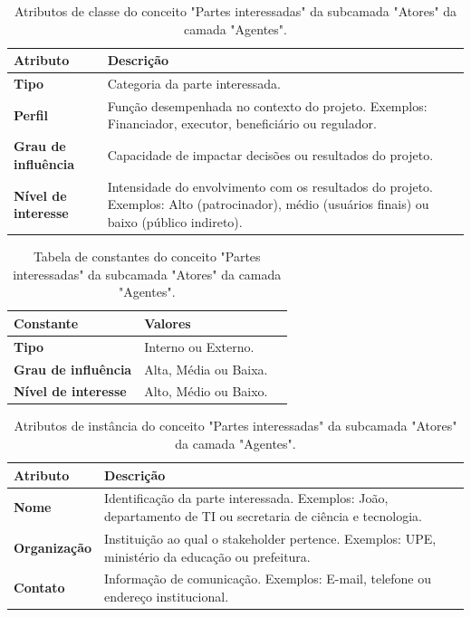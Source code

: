 \begin{apendicesenv}
\begin{table}[H]
\centering
\caption{Atributos de classe do conceito "Partes interessadas" da subcamada "Atores" da camada "Agentes".}
\begin{tabularx}{\textwidth}{|l|X|X|}
\hline
\textbf{Atributo} & \textbf{Descrição} \\ \hline
\textbf{Tipo} & Categoria da parte interessada.\\ \hline
\textbf{Perfil} & Função desempenhada no contexto do projeto. Exemplos: Financiador, executor, beneficiário ou regulador.\\ \hline
\textbf{Grau de influência} & Capacidade de impactar decisões ou resultados do projeto.\\ \hline
\textbf{Nível de interesse} & Intensidade do envolvimento com os resultados do projeto. Exemplos: Alto (patrocinador), médio (usuários finais) ou baixo (público indireto). \\ \hline
\end{tabularx}
\end{table}

\begin{table}[H]
\centering
\caption{Tabela de constantes do conceito "Partes interessadas" da subcamada "Atores" da camada "Agentes".}
\begin{tabularx}{\textwidth}{|l|X|X|}
\hline
\textbf{Constante} & \textbf{Valores} \\ \hline
\textbf{Tipo} & Interno ou Externo. \\ \hline
\textbf{Grau de influência} & Alta, Média ou Baixa.\\ \hline
\textbf{Nível de interesse} & Alto, Médio ou Baixo. \\ \hline
\end{tabularx}
\end{table}

\begin{table}[H]
\centering
\caption{Atributos de instância do conceito "Partes interessadas" da subcamada "Atores" da camada "Agentes".}
\begin{tabularx}{\textwidth}{|l|X|X|}
\hline
\textbf{Atributo} & \textbf{Descrição} \\ \hline
\textbf{Nome} & Identificação da parte interessada. Exemplos: João, departamento de TI ou secretaria de ciência e tecnologia. \\ \hline
\textbf{Organização} & Instituição ao qual o stakeholder pertence. Exemplos: UPE, ministério da educação ou prefeitura.  \\ \hline
\textbf{Contato} & Informação de comunicação. Exemplos: E-mail, telefone ou endereço institucional.\\ \hline
\end{tabularx}
\end{table}


\end{apendicesenv}
